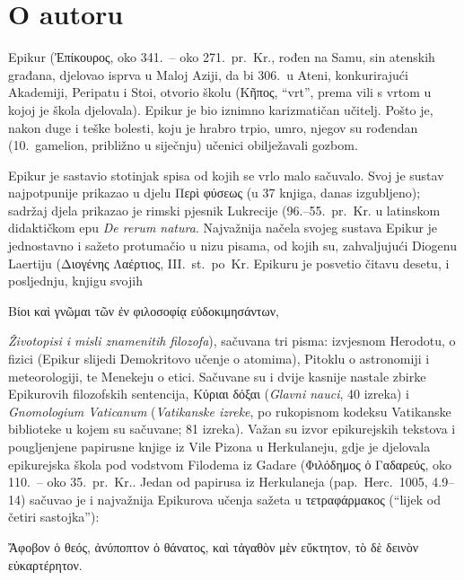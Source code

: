 \section*{O autoru}

Epikur (Ἐπίκουρος, oko 341.\ – oko 271.\ pr.~Kr., rođen na Samu, sin atenskih građana, djelovao isprva u Maloj Aziji, da bi 306.\ u Ateni, konkurirajući Akademiji, Peripatu i Stoi, otvorio školu (Κῆπος, ``vrt'', prema vili s vrtom u kojoj je škola djelovala). Epikur je bio iznimno karizmatičan učitelj. Pošto je, nakon duge i teške bolesti, koju je hrabro trpio, umro, njegov su rođendan (10.\ gamelion, približno u siječnju) učenici obilježavali gozbom.

Epikur je sastavio stotinjak spisa od kojih se vrlo malo sačuvalo. Svoj je sustav najpotpunije prikazao u djelu Περὶ φύσεως (u 37 knjiga, danas izgubljeno); sadržaj djela prikazao je rimski pjesnik Lukrecije (96.–55.\ pr.~Kr. u latinskom didaktičkom epu \textit{De rerum natura}. Najvažnija načela svojeg sustava Epikur je jednostavno i sažeto protumačio u nizu pisama, od kojih su, zahvaljujući Diogenu Laertiju (Διογένης Λαέρτιος, III.\ st.\ po~Kr. Epikuru je posvetio čitavu desetu, i posljednju, knjigu svojih \begin{greek}Βίοι καὶ γνῶμαι τῶν ἐν φιλοσοφίᾳ εὐδοκιμησάντων,\end{greek} \textit{Životopisi i misli znamenitih filozofa}), sačuvana tri pisma: izvjesnom Herodotu, o fizici (Epikur slijedi Demokritovo učenje o atomima), Pitoklu o astronomiji i meteorologiji, te Menekeju o etici. Sačuvane su i dvije kasnije nastale zbirke Epikurovih filozofskih sentencija, Κύριαι δόξαι (\textit{Glavni nauci}, 40 izreka) i \textit{Gnomologium Vaticanum} (\textit{Vatikanske izreke}, po rukopisnom kodeksu Vatikanske biblioteke u kojem su sačuvane; 81 izreka). Važan su izvor epikurejskih tekstova i pougljenjene papirusne knjige iz Vile Pizona u Herkulaneju, gdje je djelovala epikurejska škola pod vodstvom Filodema iz Gadare (Φιλόδημος ὁ Γαδαρεύς, oko 110.\ – oko 35.\ pr.~Kr.. Jedan od papirusa iz Herkulaneja (pap.\ Herc.\ 1005, 4.9–14) sačuvao je i najvažnija Epikurova učenja sažeta u τετραφάρμακος (``lijek od četiri sastojka''): \begin{greek}Ἄφοβον ὁ θεός, ἀνύποπτον ὁ θάνατος, καὶ τἀγαθὸν μὲν εὔκτητον, τὸ δὲ δεινὸν εὐκαρτέρητον.\end{greek}

